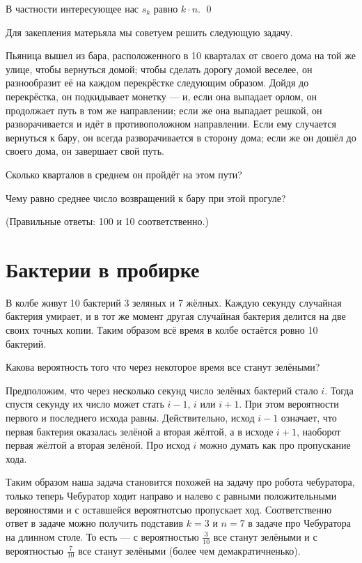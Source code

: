 \documentclass{article}
\begin{document}
В частности интересующее нас $s_k$ равно $k\cdot n$.
\qed
\medskip

Для закепления матерьяла мы советуем решить следующую задачу.

Пьяница вышел из бара, расположенного в 10 кварталах от своего дома на той же улице, чтобы вернуться домой; 
чтобы сделать дорогу домой веселее, он разнообразит её на каждом перекрёстке следующим образом. 
Дойдя до перекрёстка, он подкидывает монетку --- и, если она выпадает орлом, он продолжает путь в том же направлении; если же она выпадает решкой, он разворачивается и идёт в противоположном направлении. 
Если ему случается вернуться к бару, он всегда разворачивается в сторону дома; если же он дошёл до своего дома, он завершает свой путь. 

Сколько кварталов в среднем он пройдёт на этом пути?

Чему равно среднее число возвращений к бару при этой прогуле?

(Правильные ответы: 100 и 10 соответственно.)


\section{Бактерии в пробирке}

В колбе живут 10 бактерий 3 зеляных и 7 жёлных.
Каждую секунду случайная бактерия умирает, и в тот же момент
другая случайная бактерия делится на две своих точных копии.
Таким образом всё время в колбе остаётся ровно 10 бактерий.

Какова вероятность того что через некоторое время все станут зелёными?


Предположим, что через несколько секунд 
число зелёных бактерий стало $i$.
Тогда спустя секунду их число может стать $i-1$, $i$ или $i+1$.
При этом вероятности первого и последнего исхода равны.
Действительно, исход $i-1$ означает, 
что первая бактерия оказалась зелёной а вторая жёлтой,
а в исходе $i+1$,
наоборот первая жёлтой а вторая зелёной.
Про исход $i$ можно думать как про пропускание хода.

Таким образом наша задача становится похожей на задачу про робота чебуратора, только теперь Чебуратор ходит направо и налево с равными положительными верояностями и с оставшейся вероятнотсью пропускает ход.
Соответственно ответ в задаче можно получить подставив $k=3$ и $n=7$ в задаче про Чебуратора на длинном столе.
То есть --- с вероятностью $\tfrac{3}{10}$ все станут зелёными 
и с вероятностью $\tfrac{7}{10}$ все станут зелёными (более чем демакратичненько).
\end{document}
